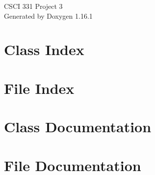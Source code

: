 \documentclass[twoside]{book}
\newcommand{\+}{\discretionary{\mbox{\scriptsize$\hookleftarrow$}}{}{}}
\newcommand{\clearemptydoublepage}{%
    \newpage{\pagestyle{empty}\cleardoublepage}%
  }
\begin{document}
  \raggedbottom
    \hypersetup{pageanchor=false,
                bookmarksnumbered=true,
                pdfencoding=unicode
               }
  \begin{titlepage}
  \vspace*{7cm}
  \begin{center}%
  {\Large CSCI 331 Project 3}\\
  \vspace*{1cm}
  {\large Generated by Doxygen 1.16.1}\\
  \end{center}
  \end{titlepage}
  \clearemptydoublepage
  \tableofcontents
  \clearemptydoublepage
  \hypersetup{pageanchor=true}
\chapter{Class Index}

\chapter{File Index}

\chapter{Class Documentation}









\chapter{File Documentation}
















  \backmatter
  \newpage
  \clearemptydoublepage
  \printindex
\end{document}
